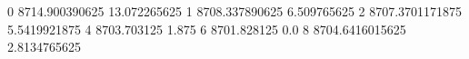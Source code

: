 0 8714.900390625 13.072265625
1 8708.337890625 6.509765625
2 8707.3701171875 5.5419921875
4 8703.703125 1.875
6 8701.828125 0.0
8 8704.6416015625 2.8134765625

